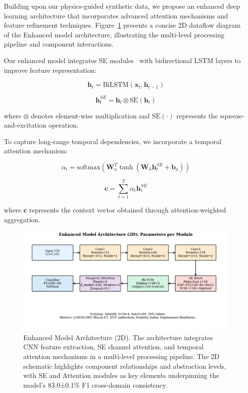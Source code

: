 \documentclass[journal]{IEEEtran}
\begin{document}
Building upon our physics-guided synthetic data, we propose an enhanced deep learning architecture that incorporates advanced attention mechanisms and feature refinement techniques. Figure~\ref{fig:enhanced_3d_arch} presents a concise 2D dataflow diagram of the Enhanced model architecture, illustrating the multi-level processing pipeline and component interactions.

Our enhanced model integrates SE modules~\cite{se_networks2018} with bidirectional LSTM layers to improve feature representation:

\begin{equation}
\mathbf{h}_t = \text{BiLSTM}(\mathbf{x}_t, \mathbf{h}_{t-1})
\end{equation}

\begin{equation}
\mathbf{h}_t^{SE} = \mathbf{h}_t \otimes \text{SE}(\mathbf{h}_t)
\end{equation}

where $\otimes$ denotes element-wise multiplication and $\text{SE}(\cdot)$ represents the squeeze-and-excitation operation.

To capture long-range temporal dependencies, we incorporate a temporal attention mechanism:

\begin{equation}
\alpha_t = \text{softmax}(\mathbf{W}_a^T \tanh(\mathbf{W}_h \mathbf{h}_t^{SE} + \mathbf{b}_a))
\end{equation}

\begin{equation}
\mathbf{c} = \sum_{t=1}^{T} \alpha_t \mathbf{h}_t^{SE}
\end{equation}

where $\mathbf{c}$ represents the context vector obtained through attention-weighted aggregation.

\begin{figure}[ht]
\centering
\includegraphics[width=\columnwidth]{figures/fig3_enhanced_model_dataflow.pdf}%
\caption{Enhanced Model Architecture (2D). The architecture integrates CNN feature extraction, SE channel attention, and temporal attention mechanisms in a multi-level processing pipeline. The 2D schematic highlights component relationships and abstraction levels, with SE and Attention modules as key elements underpinning the model's 83.0±0.1\% F1 cross-domain consistency.}
\label{fig:enhanced_3d_arch}
\end{figure}
\end{document}
